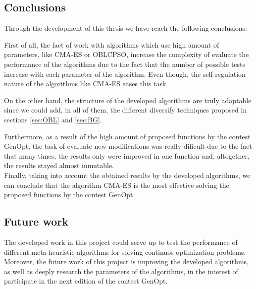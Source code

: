 
\subsection{Conclusions}

Through the development of this thesis we have reach the following conclusions: 

First of all, the fact of work with algorithms which use high amount of parameters, like CMA-ES or OBLCPSO, increase the complexity of evaluate the performance of the algorithms due to the fact that the number of possible tests increase with each parameter of the algorithm. Even though, the self-regulation nature of the algorithms like CMA-ES eases this task.

On the other hand, the structure of the developed algorithms are truly adaptable since we could add, in all of them, the different diversify techniques proposed in sections \ref{sec:OBL} and \ref{sec:BG}.

Furthermore, as a result of the high amount of proposed functions by the contest GenOpt, the task of evaluate new modifications was really dificult due to the fact that many times, the results only were improved in one function and, altogether, the results stayed almost inmutable. \\

Finally, taking into account the obtained results by the developed algorithms, we can conclude that the algorithm CMA-ES is the most effective solving the proposed functions by the contest GenOpt.



\subsection{Future work}

The developed work in this project could serve up to test the performance of different meta-heuristic algorithms for solving continuos optimization problems.\\

Moreover, the future work of this project is improving the developed algorithms, as well as deeply research the parameters of the algorithms, in the interest of participate in the next edition of the contest GenOpt.  
